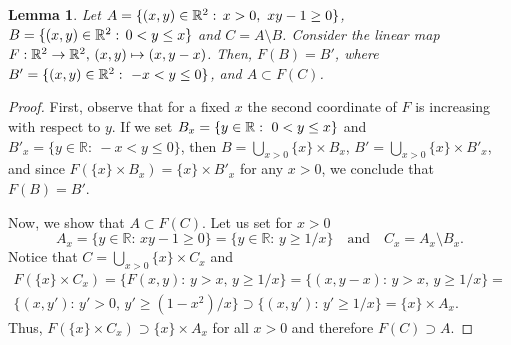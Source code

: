 \documentclass[11pt,a4paper]{amsart}
\newtheorem{lem}[theor]{Lemma}
\theoremstyle{definition}
\theoremstyle{remark}
\begin{document}
\begin{lem}\label{step3}
Let $A=\{(x,y)\in{\mathbb R}^2:\, x>0, \ xy-1\geq0\}$, $B=\{(x,y)\in{\mathbb R}^2:\, 0<y\leq x\}$ and $C=A\setminus B$. 
Consider the linear map $F:{\mathbb R}^2\to{\mathbb R}^2,\, (x,y)\mapsto(x,y-x)$. Then, $F(B)=B'$, where $B'=\{(x,y)\in\R^2:\ -x<y\leq0\}$, and $A\subset F(C)$.
\end{lem}
\begin{proof}
First, observe that for a fixed $x$ the second coordinate of $F$ is increasing with respect to $y$. If we set $B_x=\{y\in{\mathbb R}:\ 0<y\le x\}$ and 
$B'_x=\{y\in\mathbb R:\ -x<y\le 0\}$, then $B=\bigcup_{x>0}\{x\}\times B_x$, $B'=\bigcup_{x>0}\{x\}\times B'_x$, and since $F(\{x\}\times B_x)=\{x\}\times B'_x$ for 
any $x>0$, we conclude that $F(B)=B'$.

Now, we show that $A\subset F(C)$. Let us set for $x>0$
$$
A_x=\{y\in\mathbb R:\, xy-1\ge 0\}=\{y\in\mathbb R:\, y\ge 1/x\}\quad\text{and}\quad C_x=A_x\setminus B_x.
$$
Notice that $C=\bigcup_{x>0}\{x\}\times C_x$ and 
\begin{multline*}
F(\{x\}\times C_x)=\{F(x,y):\, y>x,\, y\ge 1/x\}=\{(x,y-x):\, y>x,\, y\ge 1/x\}=\\
\{(x,y'):\, y'>0,\, y'\ge (1-x^2)/x\}\supset\{(x,y'):\, y'\ge 1/x\}=\{x\}\times A_x.
\end{multline*}
Thus, $F(\{x\}\times C_x)\supset \{x\}\times A_x$ for all $x>0$ and therefore $F(C)\supset A$.
\end{proof}
\end{document}
